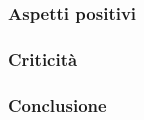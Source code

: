     \subsubsection{Aspetti positivi}
    
    \subsubsection{Criticità}
    
    \subsubsection{Conclusione}
